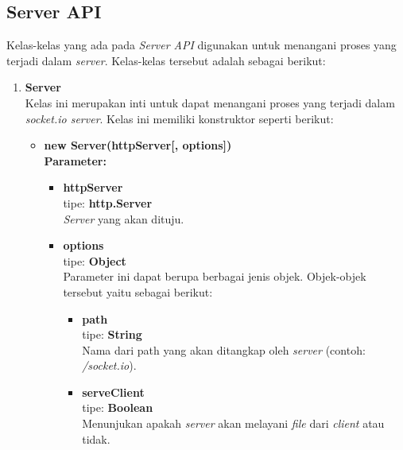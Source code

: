 \subsection{Server API}
Kelas-kelas yang ada pada \textit{Server API} digunakan untuk menangani proses yang terjadi dalam \textit{server}\cite{socketioserver}. Kelas-kelas tersebut adalah sebagai berikut:

\begin{enumerate}
	\item \textbf{Server} \\ 
	Kelas ini merupakan inti untuk dapat menangani proses yang terjadi dalam \textit{socket.io server}. Kelas ini memiliki konstruktor seperti berikut: 
	\begin{itemize}
		\item \textbf{new Server(httpServer[, options])} \\ 
		\textbf{Parameter:}
		\begin{itemize}
			\item \textbf{httpServer} \\ tipe: \textbf{http.Server} \\ \textit{Server} yang akan dituju.
			\item \textbf{options} \\ tipe: \textbf{Object} \\ Parameter ini dapat berupa berbagai jenis objek. Objek-objek tersebut yaitu sebagai berikut: 
			\begin{itemize}
				\item \textbf{path} \\ tipe: \textbf{String} \\ Nama dari path yang akan ditangkap oleh \textit{server} (contoh: \textit{/socket.io}).
				
				\item \textbf{serveClient} \\ tipe: \textbf{Boolean} \\ Menunjukan apakah \textit{server} akan melayani \textit{file} dari \textit{client} atau tidak.
				
%				
				

\end{itemize}
\end{itemize}
\end{itemize}
\end{enumerate}
